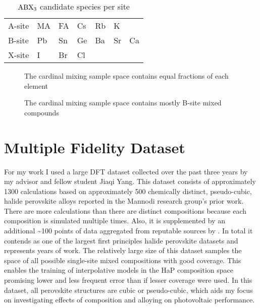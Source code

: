 \begin{table}[htbp]
\caption{\label{tbl:site_tbl} \(\ce{ABX3}\) candidate species per site}
\centering
\begin{tabular}{l|llllll}
A-site & MA & FA & Cs & Rb & K & \\[0pt]
B-site & Pb & Sn & Ge & Ba & Sr & Ca\\[0pt]
X-site & I & Br & Cl &  &  & \\[0pt]
\end{tabular}
\end{table}

 
\begin{figure}[htbp]
\centering

\caption{\label{fig:domainstats} The cardinal mixing sample space contains equal fractions of each element}
\end{figure}

 
\begin{figure}[htbp]
\centering

\caption{\label{fig:domainmix} The cardinal mixing sample space contains mostly B-site mixed compounds}
\end{figure}

\section{Multiple Fidelity Dataset}
\label{sec:org574fb9d}
For my work I used a large DFT dataset collected over the past three years by my advisor and fellow student Jiaqi Yang.
This dataset consists of approximately 1300 calculations based on approximately 500 chemically distinct, pseudo-cubic, halide perovskite alloys reported in the Mannodi research group's prior work.
\autocite{mannodi-kanakkithodi-2022-data-driven,yang-2023-high-throug}
There are more calculations than there are distinct compositions because each composition is simulated multiple times.
Also, it is supplemented by an additional \textasciitilde{}100 points of data aggregated from reputable sources by \textcite{almora-2020-devic-perfor}.
In total it contends as one of the largest first principles halide perovskite datasets and represents years of work.
The relatively large size of this dataset samples the space of all possible single-site mixed compositions with good coverage.
This enables the training of interpolative models in the HaP composition space promising lower and less frequent error than if lesser coverage were used.
In this dataset, all perovskite structures are cubic or pseudo-cubic, which aids my focus on investigating effects of composition and alloying on photovoltaic performance.


